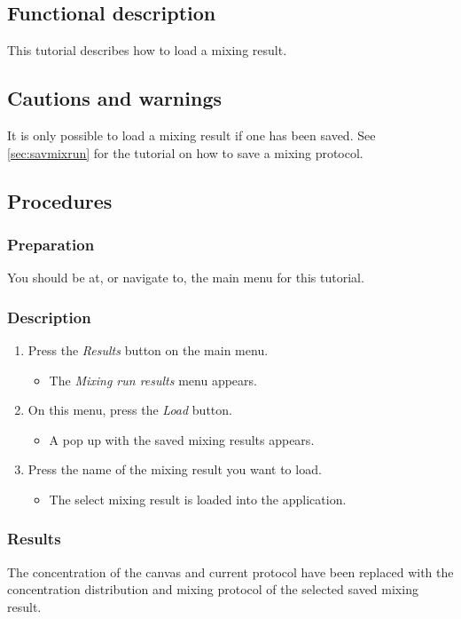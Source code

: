 \subsection{Functional description}
This tutorial describes how to load a mixing result.

\subsection{Cautions and warnings}
It is only possible to load a mixing result if one has been saved. See \ref{sec:savmixrun} for the tutorial on how to save a mixing protocol.

\subsection{Procedures}
\subsubsection{Preparation}
You should be at, or navigate to, the main menu for this tutorial.

\subsubsection{Description}

\begin{enumerate}
	\item Press the \emph{Results} button on the main menu.
		\begin{itemize}
           \item  The \emph{Mixing run results} menu appears.
		\end{itemize}
	\item On this menu, press the \emph{Load} button.
		\begin{itemize}
            \item A pop up with the saved mixing results appears.
		\end{itemize}
	\item  Press the name of the mixing result you want to load.
		\begin{itemize}
           \item  The select mixing result is loaded into the application.
		\end{itemize}
\end{enumerate}

\subsubsection{Results}
The concentration of the canvas and current protocol have been replaced with the concentration distribution and mixing protocol of the selected saved mixing result.


